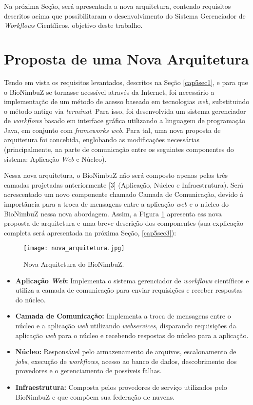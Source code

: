 Na próxima Seção, será apresentada a nova arquitetura, contendo requisitos descritos acima que possibilitaram o desenvolvimento do Sistema Gerenciador de \textit{Workflows} Científicos, objetivo deste trabalho.

\section{Proposta de uma Nova Arquitetura} \label{cap5sec2}

Tendo em vista os requisitos levantados, descritos na Seção \ref{cap5sec1}, e para que o BioNimbuZ se tornasse acessível através da Internet, foi necessário a implementação de um método de acesso baseado em tecnologias \textit{web}, substituindo o método antigo via \textit{terminal}. Para isso, foi desenvolvida um sistema gerenciador de \textit{workflows} basado em interface gráfica utilizando a linguagem de programação Java, em conjunto com \textit{frameworks web}. Para tal, uma nova proposta de arquitetura foi concebida, englobando as modificações necessárias (principalmente, na parte de comunicação entre os seguintes componentes do sistema: Aplicação \textit{Web} e Núcleo). 

Nessa nova arquitetura, o BioNimbuZ não será composto apenas pelas três camadas projetadas anteriormente [3] (Aplicação, Núcleo e Infraestrutura). Será acrescentado um novo componente chamado Camada de Comunicação, devido à importância para a troca de mensagens entre a aplicação \textit{web} e o núcleo do BioNimbuZ nessa nova abordagem. Assim, a Figura \ref{fig:proposta_arquitetura} apresenta ess nova proposta de arquitetura e uma breve descrição dos componentes (sua explicação completa será apresentada na próxima Seção, \ref{cap5sec3}): 

\begin{figure}[H]
	\centering
	\texttt{[image: nova\_arquitetura.jpg]}
	\caption{Nova Arquitetura do BioNimbuZ.}
	\label{fig:proposta_arquitetura}
\end{figure}

\begin{itemize}
	\item \textbf{Aplicação \textit{Web}:} Implementa o sistema gerenciador de \textit{workflows} científicos e utiliza a camada de comunicação para enviar requisições e receber respostas do núcleo.
    \item \textbf{Camada de Comunicação:} Implementa a troca de mensagens entre o núcleo e a aplicação \textit{web} utilizando \textit{webservices}, disparando requisições da aplicação \textit{web} para o núcleo e recebendo respostas do núcleo para a aplicação.
    \item \textbf{Núcleo:} Responsável pelo armazenamento de arquivos, escalonamento de \textit{jobs}, execução de \textit{workflows}, acesso ao banco de dados, descobrimento dos provedores e o gerenciamento de possíveis falhas.

\item \textbf{Infraestrutura:} Composta pelos provedores de serviço utilizados pelo BioNimbuZ e que compõem sua federação de nuvens.
\end{itemize}

